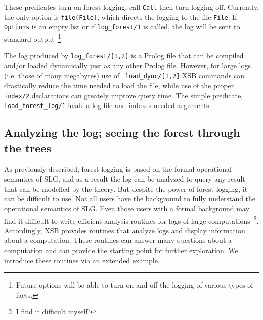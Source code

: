 \begin{description}
%
These predicates turn on forest logging, call {\tt Call} then turn
logging off.  Currently, the only option is {\tt file(File)}, which
directs the logging to the file {\tt File}.  If {\tt Options} is an
empty list or if {\tt log\_forest/1} is called, the log will be sent
to standard output~\footnote{Future options will be able to turn on
  and off the logging of various types of facts.}.

%
The log produced by {\tt log\_forest/[1,2]} is a Prolog file that can
be compiled and/or loaded dynamically just as any other Prolog file.
However, for large logs (i.e. those of many megabytes) use of {\tt
  load\_dync/[1,2]} XSB commands can drastically reduce the time
needed to load the file, while use of the proper {\tt index/2}
declarations can greately improve query time.  The simple predicate,
{\tt load\_forest\_log/1} loads a log file and indexes needed arguments.
\end{description}


\subsection{Analyzing the log; seeing the forest through the trees} \label{sec:forest-log-anal}
%
As previously described, forest logging is based on the formal
operational semantics of SLG, and as a result the log can be analyzed
to query any result that can be modelled by the theory.  But despite
the power of forest logging, it can be difficult to use.  Not all
users have the background to fully understand the operational
semantics of SLG.  Even those users with a formal background may find
it difficult to write efficient analysis routines for logs of large
computations~\footnote{I find it difficult myself!}.  Accordingly, XSB
provides routines that analyze logs and display information about a
computation.  These routines can answer many questions about a
computation and can provide the starting point for further
exploration.  We introduce these routines via an extended example.

